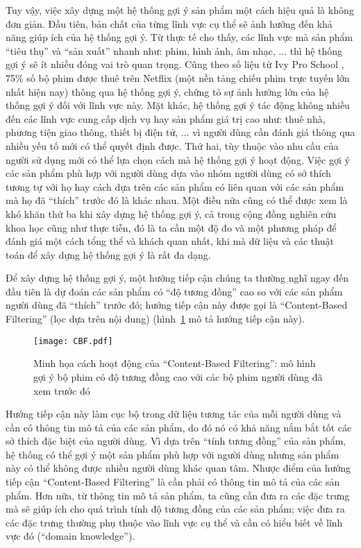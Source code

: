 Tuy vậy, việc xây dựng một hệ thống gợi ý sản phẩm một cách hiệu quả là không đơn giản.
Đầu tiên, bản chất của từng lĩnh vực cụ thể sẽ ảnh hưởng đến khả năng giúp ích của hệ thống gợi ý.
Từ thực tế cho thấy, các lĩnh vực mà sản phẩm ``tiêu thụ'' và ``sản xuất'' nhanh như: phim, hình ảnh, âm nhạc, ... 
thì hệ thống gợi ý sẽ ít nhiều đóng vai trò quan trọng. 
Cũng theo số liệu từ Ivy Pro School \cite{ivy}, 75\% số bộ phim được thuê trên Netflix (một nền tảng chiếu phim trực tuyến lớn nhất hiện nay) thông qua hệ thống gợi ý, chứng tỏ sự ảnh hưởng lớn của hệ thống gợi ý đối với lĩnh vực này. 
Mặt khác, hệ thống gợi ý tác động không nhiều đến các lĩnh vực cung cấp dịch vụ hay sản phẩm giá trị cao như:
thuê nhà, phương tiện giao thông, thiết bị điện tử, ... vì người dùng cần đánh giá thông qua nhiều yếu tố mới có thể quyết định được. 
Thứ hai, tùy thuộc vào nhu cầu của người sử dụng mới có thể lựa chọn cách mà hệ thống gợi ý hoạt động.
Việc gợi ý các sản phẩm phù hợp với người dùng dựa vào nhóm người dùng có sở thích tương tự với họ 
hay cách dựa trên các sản phẩm có liên quan với các sản phẩm mà họ đã ``thích'' trước đó là khác nhau.
Một điều nữa cũng có thể được xem là khó khăn thứ ba khi xây dựng hệ thống gợi ý, cả trong cộng đồng nghiên cứu khoa học cũng như thực tiễn, 
đó là ta cần một độ đo và một phương pháp để đánh giá một cách tổng thể và khách quan nhất, 
khi mà dữ liệu và các thuật toán để xây dựng hệ thống gợi ý là rất đa dạng.

Để xây dựng hệ thống gợi ý, một hướng tiếp cận chúng ta thường nghĩ ngay đến đầu tiên
là dự đoán các sản phẩm có ``độ tương đồng'' cao so với các sản phẩm người dùng đã ``thích'' trước đó;
hướng tiếp cận này được gọi là ``Content-Based Filtering'' (lọc dựa trên nội dung) (hình~\ref{fig_CBF} mô tả hướng tiếp cận này).
\begin{figure}
    \centering
	\texttt{[image: CBF.pdf]}
    \caption[Minh họa cách hoạt động của ``Content-Based Filtering'']{Minh họa cách hoạt động của ``Content-Based Filtering'':
    mô hình gợi ý bộ phim có độ tương đồng cao với các bộ phim
    người dùng đã xem trước đó}
    \label{fig_CBF}
\end{figure}
Hướng tiếp cận này làm cục bộ trong dữ liệu tương tác của mỗi người dùng và cần có thông tin mô tả của các sản phẩm, do đó nó có khả năng nắm bắt tốt các sở thích
đặc biệt của người dùng.
Vì dựa trên ``tính tương đồng'' của sản phẩm, hệ thống có thể gợi ý một sản phẩm phù hợp với người dùng nhưng sản phẩm này có thể không được nhiều người dùng khác quan tâm.
Nhược điểm của hướng tiếp cận ``Content-Based Filtering'' là cần phải có thông tin mô tả của các sản phẩm. Hơn nữa, từ thông tin mô tả sản phẩm, ta cũng cần đưa ra các đặc trưng mà sẽ giúp ích cho quá trình tính độ tương đồng của các sản phẩm; việc đưa ra các đặc trưng thường phụ thuộc vào lĩnh vực cụ thể và cần có hiểu biết về lĩnh vực đó (``domain knowledge'').

